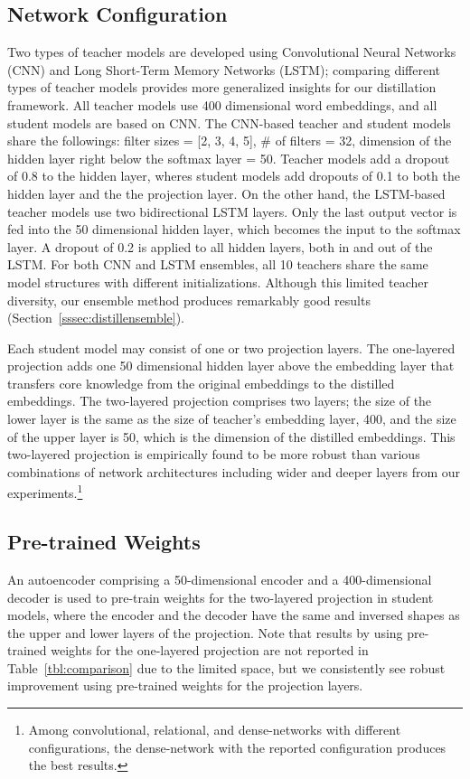 \documentclass{article}
\begin{document}
\subsection{Network Configuration}
\label{ssec:hyperparameters}
Two types of teacher models are developed using Convolutional Neural Networks (CNN) and Long Short-Term Memory Networks (LSTM); comparing different types of teacher models provides more generalized insights for our distillation framework.
All teacher models use 400 dimensional word embeddings, and all student models are based on CNN.
The CNN-based teacher and student models share the followings: filter sizes = [2, 3, 4, 5], \# of filters = 32, dimension of the hidden layer right below the softmax layer = 50.
Teacher models add a dropout of 0.8 to the hidden layer, wheres student models add dropouts of 0.1 to both the hidden layer and the the projection layer.
On the other hand, the LSTM-based teacher models use two bidirectional LSTM layers. Only the last output vector is fed into the 50 dimensional hidden layer, which becomes the input to the softmax layer.
A dropout of 0.2 is applied to all hidden layers, both in and out of the LSTM.
For both CNN and LSTM ensembles, all 10 teachers share the same model structures with different initializations.
Although this limited teacher diversity, our ensemble method produces remarkably good results (Section~\ref{sssec:distillensemble}).


Each student model may consist of one or two projection layers.
The one-layered projection adds one 50 dimensional hidden layer above the embedding layer that transfers core knowledge from the original embeddings to the distilled embeddings.
The two-layered projection comprises two layers; the size of the lower layer is the same as the size of teacher's embedding layer, 400, and the size of the upper layer is 50, which is the dimension of the distilled embeddings.
This two-layered projection is empirically found to be more robust than various combinations of network architectures including wider and deeper layers from our experiments.\footnote{Among convolutional, relational, and dense-networks with different configurations, the dense-network with the reported configuration produces the best results.}


\subsection{Pre-trained Weights}
An autoencoder comprising a 50-dimensional encoder and a 400-dimensional decoder is used to pre-train weights for the two-layered projection in student models, where the encoder and the decoder have the same and inversed shapes as the upper and lower layers of the projection. Note that results by using pre-trained weights for the one-layered projection are not reported in Table~\ref{tbl:comparison} due to the limited space, but we consistently see robust improvement using pre-trained weights for the projection layers.
\end{document}
